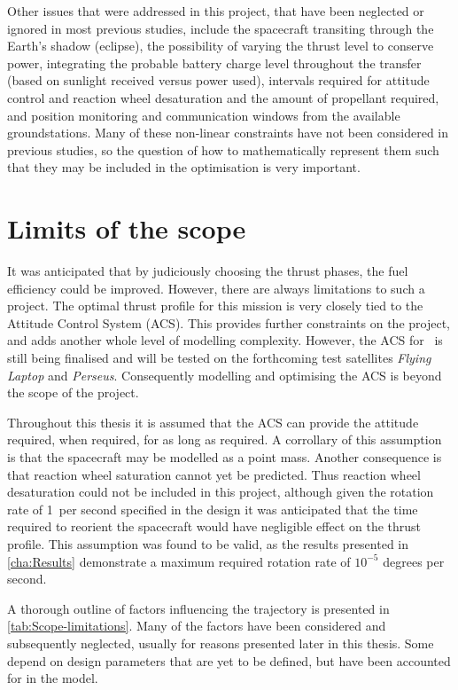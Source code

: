 Other issues that were addressed in this project, that have been neglected or ignored in most previous studies, include the spacecraft transiting through the Earth's shadow (eclipse), the possibility of varying the thrust level to conserve power, integrating the probable battery charge level throughout the transfer (based on sunlight received versus power used), intervals required for attitude control and reaction wheel desaturation and the amount of propellant required, and position monitoring and communication windows from the available groundstations. Many of these non-linear constraints have not been considered in previous studies, so the question of how to mathematically represent them such that they may be included in the optimisation is very important.


\section{Limits of the scope} \label{sec:Limits}

It was anticipated that by judiciously choosing the thrust phases, the fuel efficiency could be improved. However, there are always limitations to such a project. The optimal thrust profile for this mission is very closely tied to the Attitude Control System (ACS). This provides further constraints on the project, and adds another whole level of modelling complexity. However, the ACS for \BW\ is still being finalised and will be tested on the forthcoming test satellites \emph{Flying Laptop} and \emph{Perseus}. Consequently modelling and optimising the ACS is beyond the scope of the project. 

Throughout this thesis it is assumed that the ACS can provide the attitude required, when required, for as long as required. A corrollary of this assumption is that the spacecraft may be modelled as a point mass. Another consequence is that reaction wheel saturation cannot yet be predicted. Thus reaction wheel desaturation could not be included in this project, although given the rotation rate of 1\degrees\ per second specified in the design it was anticipated that the time required to reorient the spacecraft would have negligible effect on the thrust profile. This assumption was found to be valid, as the results presented in \autoref{cha:Results} demonstrate a maximum required rotation rate of $10^{-5}$ degrees per second.

A thorough outline of factors influencing the trajectory is presented in \autoref{tab:Scope-limitations}. Many of the factors have been considered and subsequently neglected, usually for reasons presented later in this thesis. Some depend on design parameters that are yet to be defined, but have been accounted for in the model.

